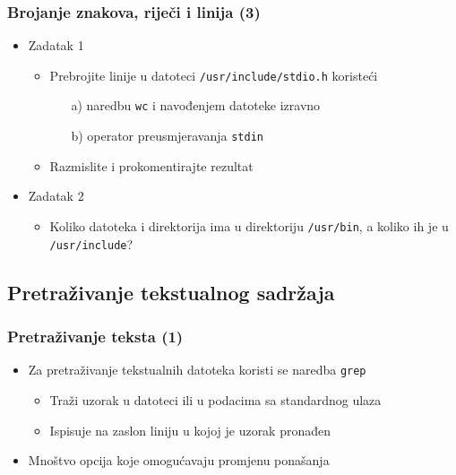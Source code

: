 \documentclass{beamer}
\newcommand{\shell}[1]{\texttt{#1}}
\begin{document}
\begin{frame}[t]
\frametitle{Brojanje znakova, riječi i linija (3)}
\begin{itemize}
  \item Zadatak 1
  \begin{itemize}
	\item Prebrojite linije u datoteci \shell{/usr/include/stdio.h} koristeći
	\begin{itemize}
		\item[a)] naredbu \shell{wc} i navođenjem datoteke izravno
		\item[b)] operator preusmjeravanja \shell{stdin}
	\end{itemize}
	\item Razmislite i prokomentirajte rezultat
  \end{itemize}
  \item[]
  \item Zadatak 2
  \begin{itemize}
    \item Koliko datoteka i direktorija ima u direktoriju \shell{/usr/bin},
          a koliko ih je u \shell{/usr/include}?
  \end{itemize}
\end{itemize}
\end{frame}

\subsection{Pretraživanje tekstualnog sadržaja}
\begin{frame}[t]
\frametitle{Pretraživanje teksta (1)}
\begin{itemize}
  \item Za pretraživanje tekstualnih datoteka koristi se naredba
        \shell{grep}
  \begin{itemize}
    \item Traži uzorak u datoteci ili u podacima sa standardnog ulaza
    \item Ispisuje na zaslon liniju u kojoj je uzorak pronađen
  \end{itemize}
  \item Mnoštvo opcija koje omogućavaju promjenu ponašanja
\end{itemize}
\end{frame}
\end{document}
